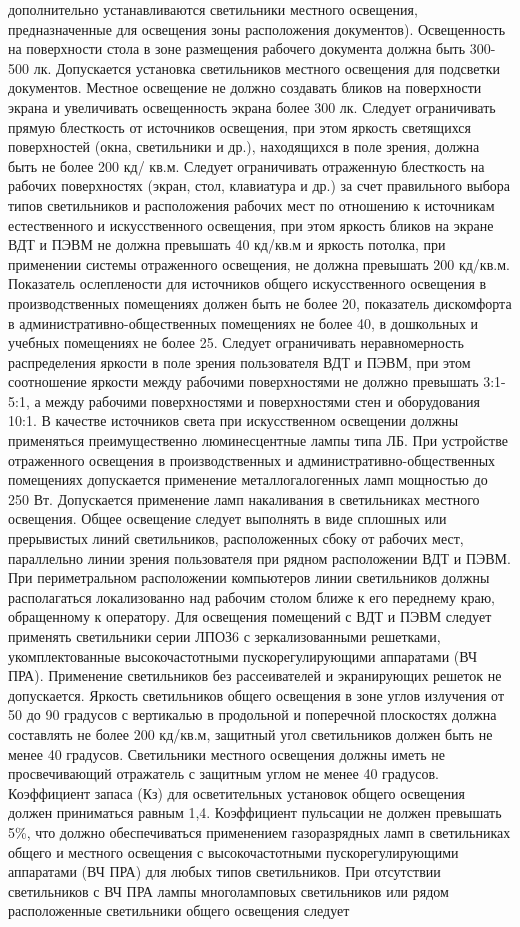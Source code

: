 дополнительно устанавливаются светильники местного освещения, предназначенные для освещения зоны расположения документов). Освещенность на поверхности стола в зоне размещения рабочего документа должна быть 300-500 лк. Допускается установка светильников местного освещения для подсветки документов. Местное освещение не должно создавать бликов на поверхности экрана и увеличивать освещенность экрана более 300 лк. Следует ограничивать прямую блесткость от источников освещения, при этом яркость светящихся поверхностей (окна, светильники и др.), находящихся в поле зрения, должна быть не более 200 кд/ кв.м. Следует ограничивать отраженную блесткость на рабочих поверхностях (экран, стол, клавиатура и др.) за счет правильного выбора типов светильников и расположения рабочих мест по отношению к источникам естественного и искусственного освещения, при этом яркость бликов на экране ВДТ и ПЭВМ не должна превышать 40 кд/кв.м и яркость потолка, при применении системы отраженного освещения, не должна превышать 200 кд/кв.м. Показатель ослеплености для источников общего искусственного освещения в производственных помещениях должен быть не более 20, показатель дискомфорта в административно-общественных помещениях не более 40, в дошкольных и учебных помещениях не более 25. Следует ограничивать неравномерность распределения яркости в поле зрения пользователя ВДТ и ПЭВМ, при этом соотношение яркости между рабочими поверхностями не должно превышать 3:1-5:1, а между рабочими поверхностями и поверхностями стен и оборудования 10:1. В качестве источников света при искусственном освещении должны применяться преимущественно люминесцентные лампы типа ЛБ. При устройстве отраженного освещения в производственных и административно-общественных помещениях допускается применение металлогалогенных ламп мощностью до 250 Вт. Допускается применение ламп накаливания в светильниках местного освещения. Общее освещение следует выполнять в виде сплошных или прерывистых линий светильников, расположенных сбоку от рабочих мест, параллельно линии зрения пользователя при рядном расположении ВДТ и ПЭВМ. При периметральном расположении компьютеров линии светильников должны располагаться локализованно над рабочим столом ближе к его переднему краю, обращенному к оператору. Для освещения помещений с ВДТ и ПЭВМ следует применять светильники серии ЛПОЗ6 с зеркализованными решетками, укомплектованные высокочастотными пускорегулирующими аппаратами (ВЧ ПРА). Применение светильников без рассеивателей и экранирующих решеток не допускается. Яркость светильников общего освещения в зоне углов излучения от 50 до 90 градусов с вертикалью в продольной и поперечной плоскостях должна составлять не более 200 кд/кв.м, защитный угол светильников должен быть не менее 40 градусов. Светильники местного освещения должны иметь не просвечивающий отражатель с защитным углом не менее 40 градусов. Коэффициент запаса (Кз) для осветительных установок общего освещения должен приниматься равным 1,4. Коэффициент пульсации не должен превышать 5\%, что должно обеспечиваться применением газоразрядных ламп в светильниках общего и местного освещения с высокочастотными пускорегулирующими аппаратами (ВЧ ПРА) для любых типов светильников. При отсутствии светильников с ВЧ ПРА лампы многоламповых светильников или рядом расположенные светильники общего освещения следует 